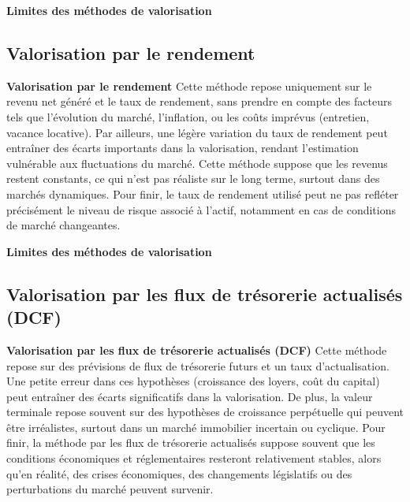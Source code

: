 \documentclass{beamer}
\begin{document}
\begin{frame}{\textbf{Limites des méthodes de valorisation}}

\subsection{Valorisation par le rendement}
\begin{block}{\textbf{Valorisation par le rendement}}
Cette méthode repose uniquement sur le revenu net généré et le taux de rendement, sans prendre en compte des facteurs tels que l’évolution du marché, l’inflation, ou les coûts imprévus (entretien, vacance locative). Par ailleurs, une légère variation du taux de rendement peut entraîner des écarts importants dans la valorisation, rendant l'estimation vulnérable aux fluctuations du marché. Cette méthode suppose que les revenus restent constants, ce qui n’est pas réaliste sur le long terme, surtout dans des marchés dynamiques. Pour finir, le taux de rendement utilisé peut ne pas refléter précisément le niveau de risque associé à l’actif, notamment en cas de conditions de marché changeantes.
\end{block}
\end{frame}

\begin{frame}{\textbf{Limites des méthodes de valorisation}}
	
	\subsection{Valorisation par les flux de trésorerie actualisés (DCF)}
	\begin{block}{\textbf{Valorisation par les flux de trésorerie actualisés (DCF)}}
Cette méthode repose sur des prévisions de flux de trésorerie futurs et un taux d’actualisation. Une petite erreur dans ces hypothèses (croissance des loyers, coût du capital) peut entraîner des écarts significatifs dans la valorisation. De plus, la valeur terminale repose souvent sur des hypothèses de croissance perpétuelle qui peuvent être irréalistes, surtout dans un marché immobilier incertain ou cyclique. Pour finir, la méthode par les flux de trésorerie actualisés suppose souvent que les conditions économiques et réglementaires resteront relativement stables, alors qu’en réalité, des crises économiques, des changements législatifs ou des perturbations du marché peuvent survenir.
	\end{block}

\end{frame}
\end{document}
